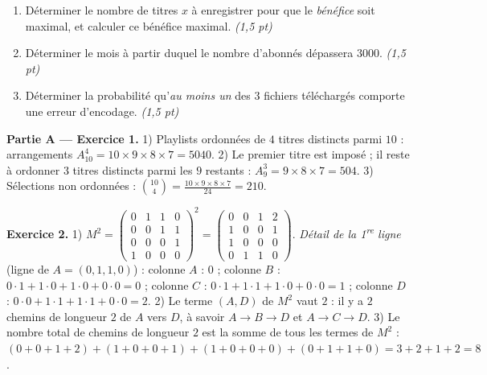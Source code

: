 \begin{enumerate}[label=\textbf{Tâche \arabic*.},leftmargin=2.4em]
\item Déterminer le nombre de titres $x$ à enregistrer pour que le \emph{bénéfice} soit
maximal, et calculer ce bénéfice maximal. \hfill\textit{(1,5 pt)}
\item Déterminer le mois à partir duquel le nombre d'abonnés dépassera $3000$. \hfill\textit{(1,5 pt)}
\item Déterminer la probabilité qu'\emph{au moins un} des $3$ fichiers téléchargés comporte
une erreur d'encodage. \hfill\textit{(1,5 pt)}
\end{enumerate}
\par{}


\noindent\textbf{Partie A — Exercice 1.}
1) Playlists ordonnées de $4$ titres distincts parmi $10$ : arrangements
$A_{10}^4=10\times9\times8\times7=5040$.
2) Le premier titre est imposé ; il reste à ordonner $3$ titres distincts parmi les $9$
restants : $A_9^3=9\times8\times7=504$.
3) Sélections non ordonnées : $\binom{10}{4}=\frac{10\times9\times8\times7}{24}=210$.

\noindent\textbf{Exercice 2.}
1) $M^2=\begin{pmatrix}0&1&1&0\\0&0&1&1\\0&0&0&1\\1&0&0&0\end{pmatrix}^2
=\begin{pmatrix}0&0&1&2\\1&0&0&1\\1&0&0&0\\0&1&1&0\end{pmatrix}$.
\emph{Détail de la 1\textsuperscript{re} ligne} (ligne de $A=(0,1,1,0)$) : colonne $A$ :
$0$ ; colonne $B$ : $0\cdot1+1\cdot0+1\cdot0+0\cdot0=0$ ; colonne $C$ :
$0\cdot1+1\cdot1+1\cdot0+0\cdot0=1$ ; colonne $D$ : $0\cdot0+1\cdot1+1\cdot1+0\cdot0=2$.
2) Le terme $(A,D)$ de $M^2$ vaut $2$ : il y a $2$ chemins de longueur $2$ de $A$ vers $D$,
à savoir $A\to B\to D$ et $A\to C\to D$.
3) Le nombre total de chemins de longueur $2$ est la somme de tous les termes de $M^2$ :
$(0+0+1+2)+(1+0+0+1)+(1+0+0+0)+(0+1+1+0)=3+2+1+2=8$.

